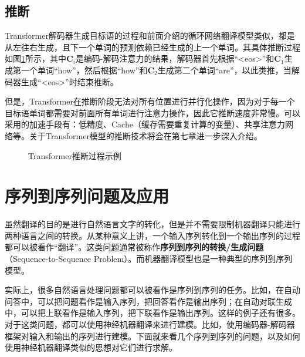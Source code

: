 \subsection{推断}

\parinterval Transformer解码器生成目标语的过程和前面介绍的循环网络翻译模型类似，都是从左往右生成，且下一个单词的预测依赖已经生成的上一个单词。其具体推断过程如图\ref{fig:6-56}所示，其中$\mathbf{C}_i$是编码-解码注意力的结果，解码器首先根据``<eos>''和$\mathbf{C}_1$生成第一个单词``how''，然后根据``how''和$\mathbf{C}_2$生成第二个单词``are''，以此类推，当解码器生成``<eos>''时结束推断。

\parinterval 但是，Transformer在推断阶段无法对所有位置进行并行化操作，因为对于每一个目标语单词都需要对前面所有单词进行注意力操作，因此它推断速度非常慢。可以采用的加速手段有：低精度\cite{DBLP:journals/corr/CourbariauxB16}、Cache（缓存需要重复计算的变量）\cite{DBLP:journals/corr/abs-1805-00631}、共享注意力网络等\cite{Xiao2019SharingAW}。关于Transformer模型的推断技术将会在第七章进一步深入介绍。

\begin{figure}[htp]
\centering

\caption{Transformer推断过程示例}
\label{fig:6-56}
\end{figure}


\sectionnewpage
\section{序列到序列问题及应用}

\parinterval 虽然翻译的目的是进行自然语言文字的转化，但是并不需要限制机器翻译只能进行两种语言之间的转换。从某种意义上讲，一个输入序列转化到一个输出序列的过程都可以被看作``翻译''。这类问题通常被称作{\small\sffamily\bfseries{序列到序列的转换/生成问题}}（Sequence-to-Sequence Problem）。而机器翻译模型也是一种典型的序列到序列模型。

\parinterval 实际上，很多自然语言处理问题都可以被看作是序列到序列的任务。比如，在自动问答中，可以把问题看作是输入序列，把回答看作是输出序列；在自动对联生成中，可以把上联看作是输入序列，把下联看作是输出序列。这样的例子还有很多。对于这类问题，都可以使用神经机器翻译来进行建模。比如，使用编码器-解码器框架对输入和输出的序列进行建模。下面就来看几个序列到序列的问题，以及如何使用神经机器翻译类似的思想对它们进行求解。


